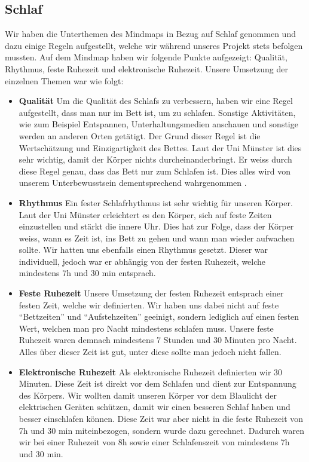 \subsection{Schlaf}
\authortoc{\bastian}{\subsectionident}
Wir haben die Unterthemen des Mindmaps in Bezug auf Schlaf genommen und dazu einige Regeln aufgestellt, welche wir während unseres Projekt stets befolgen mussten.
\newline
Auf dem Mindmap haben wir folgende Punkte aufgezeigt: Qualität, Rhythmus, feste Ruhezeit und elektronische Ruhezeit. 
\newline
\newline
Unsere Umsetzung der einzelnen Themen war wie folgt:
\begin{itemize}
  \item \textbf{Qualität}
  \newline
  Um die Qualität des Schlafs zu verbessern, haben wir eine Regel aufgestellt, dass man nur im Bett ist, um zu schlafen. Sonstige Aktivitäten, wie zum Beispiel Entspannen, Unterhaltungsmedien anschauen und sonstige werden an anderen Orten getätigt. Der Grund dieser Regel ist die Wertschätzung und Einzigartigkeit des Bettes. Laut der Uni Münster ist dies sehr wichtig, damit der Körper nichts durcheinanderbringt. Er weiss durch diese Regel genau, dass das Bett nur zum Schlafen ist. Dies alles wird von unserem Unterbewusstsein dementsprechend wahrgenommen \cite{schlaf_regeln}.
  \item \textbf{Rhythmus}
  \newline
  Ein fester Schlafrhythmus ist sehr wichtig für unseren Körper. Laut der Uni Münster erleichtert es den Körper, sich auf feste Zeiten einzustellen und stärkt die innere Uhr. Dies hat zur Folge, dass der Körper weiss, wann es Zeit ist, ins Bett zu gehen und wann man wieder aufwachen sollte. Wir hatten uns ebenfalls einen Rhythmus gesetzt. Dieser war individuell, jedoch war er abhängig von der festen Ruhezeit, welche mindestens 7h und 30 min entsprach.
  \item \textbf{Feste Ruhezeit}
  \newline
  Unsere Umsetzung der festen Ruhezeit entsprach einer festen Zeit, welche wir definierten. Wir haben uns dabei nicht auf feste “Bettzeiten” und “Aufstehzeiten” geeinigt, sondern lediglich auf einen festen Wert, welchen man pro Nacht mindestens schlafen muss. Unsere feste Ruhezeit waren demnach mindestens 7 Stunden und 30 Minuten pro Nacht. Alles über dieser Zeit ist gut, unter diese sollte man jedoch nicht fallen.
  \item \textbf{Elektronische Ruhezeit}
  \newline
  Als elektronische Ruhezeit definierten wir 30 Minuten. Diese Zeit ist direkt vor dem Schlafen und dient zur Entspannung des Körpers. Wir wollten damit unseren Körper vor dem Blaulicht der elektrischen Geräten schützen, damit wir einen besseren Schlaf haben und besser einschlafen können. Diese Zeit war aber nicht in die feste Ruhezeit von 7h und 30 min miteinbezogen, sondern wurde dazu gerechnet. Dadurch waren wir bei einer Ruhezeit von 8h sowie einer Schlafenszeit von mindestens 7h und 30 min.
\end{itemize}
